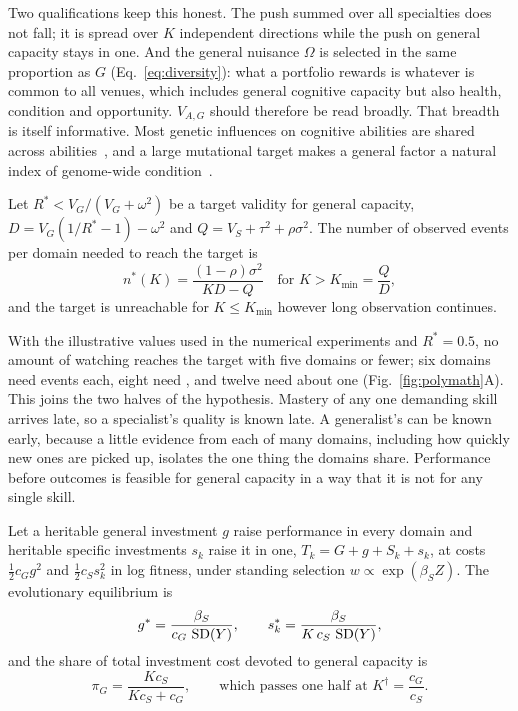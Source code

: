 Two qualifications keep this honest. The push summed over all specialties does not fall; it is spread over $K$ independent
directions while the push on general capacity stays in one. And the general nuisance $\Omega$ is selected in the same
proportion as $G$ (Eq.~\ref{eq:diversity}): what a portfolio rewards is whatever is common to all venues, which includes
general cognitive capacity but also health, condition and opportunity. $V_{A,G}$ should therefore be read broadly. That
breadth is itself informative. Most genetic influences on cognitive abilities are shared across abilities~\cite{kovas2006,plomin2015},
and a large mutational target makes a general factor a natural index of genome-wide condition~\cite{rowe1996,keller2006}.

\begin{proposition}\label{prop:time}
Let $R^*<V_G/(V_G+\omega^2)$ be a target validity for general capacity, $D=V_G(1/R^*-1)-\omega^2$ and
$Q=V_S+\tau^2+\rho\sigma^2$. The number of observed events per domain needed to reach the target is
\begin{equation}
n^*(K)=\frac{(1-\rho)\sigma^2}{KD-Q}\quad\text{for }K>K_{\min}=\frac{Q}{D},\label{eq:nstarK}
\end{equation}
and the target is unreachable for $K\le K_{\min}$ however long observation continues.
\end{proposition}

With the illustrative values used in the numerical experiments and $R^*=0.5$, no amount of watching reaches the target with
five domains or fewer; six domains need \PolyNSix{} events each, eight need \PolyNEight, and twelve need about one
(Fig.~\ref{fig:polymath}A). This joins the two halves of the hypothesis. Mastery of any one demanding skill arrives late, so a
specialist's quality is known late. A generalist's can be known early, because a little evidence from each of many domains,
including how quickly new ones are picked up, isolates the one thing the domains share. Performance before outcomes is
feasible for general capacity in a way that it is not for any single skill.

\begin{proposition}\label{prop:polymath}
Let a heritable general investment $g$ raise performance in every domain and heritable specific investments $s_k$ raise it in
one, $T_k=G+g+S_k+s_k$, at costs $\tfrac12c_Gg^2$ and $\tfrac12c_Ss_k^2$ in log fitness, under standing selection
$w\propto\exp(\beta_SZ)$. The evolutionary equilibrium is
\begin{equation}
g^*=\frac{\beta_S}{c_G\,\operatorname{SD}(Y)},\qquad s_k^*=\frac{\beta_S}{K\,c_S\,\operatorname{SD}(Y)},\label{eq:gstar}
\end{equation}
and the share of total investment cost devoted to general capacity is
\begin{equation}
\pi_G=\frac{Kc_S}{Kc_S+c_G},\qquad\text{which passes one half at }K^\dagger=\frac{c_G}{c_S}.\label{eq:share}
\end{equation}
\end{proposition}


